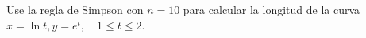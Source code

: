 \item Use la regla de Simpson con $n = 10$ para calcular la longitud de la curva $x = \ln t, y = e^t, \quad 1 \le t \le 2$.
